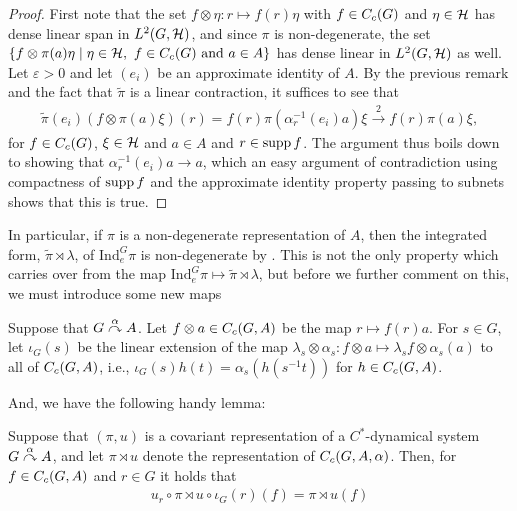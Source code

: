 \begin{proof}
	First note that the set $ f \otimes \eta \colon r \mapsto f(r) \eta$ with $f \in C_c(G)$ and $\eta \in \mathcal{H}$ has dense linear span in $L^2(G,\mathcal{H})$, and since $\pi$ is non-degenerate, the set $\{ f \otimes \pi(a) \eta \mid \eta \in \mathcal{H}, \ f \in C_c(G) \text{ and } a \in A \}$ has dense linear in $L^2(G, \mathcal{H})$ as well. Let $\varepsilon > 0$ and let $(e_i)$ be an approximate identity of $A$. By the previous remark and the fact that $\tilde{\pi}$ is a linear contraction, it suffices to see that 
	\begin{align*}
		\tilde{\pi}(e_i) (f \otimes \pi(a) \xi)(r)=f(r) \pi(\alpha_{r}^{-1}(e_i)a) \xi   \stackrel 2 \to f(r) \pi(a) \xi,
	\end{align*}
	for $f \in C_c(G)$, $\xi \in \mathcal{H}$ and $a \in A$ and $r \in \operatorname{supp} f$. The argument thus boils down to showing that $\alpha_r^{-1}(e_i) a \to a$, which an easy argument of contradiction using compactness of $\operatorname{supp} f$ and the approximate identity property passing to subnets shows that this is true.
\end{proof}
\begin{remark}
	In particular, if $\pi$ is a non-degenerate representation of $A$, then the integrated form, $\tilde{\pi} \rtimes \lambda$, of $\mathrm{Ind}_e^G \pi$ is non-degenerate by . This is not the only property which carries over from the map $\mathrm{Ind}_e^G \pi \mapsto \tilde{\pi} \rtimes \lambda$, but before we further comment on this, we must introduce some new maps
\end{remark}
\begin{definition}
	Suppose that $G \stackrel{\alpha}{\curvearrowright} A$. Let $f \otimes a  \in C_c(G,A)$ be the map $r \mapsto f(r)a$. For $s \in G$, let $\iota_G(s)$ be the linear extension of the map $\lambda_s \otimes \alpha_s \colon f \otimes a \mapsto \lambda_s f \otimes \alpha_s(a)$ to all of $C_c(G,A)$, i.e., $\iota_G(s) h(t) = \alpha_s(h(s^{-1}t))$ for $h \in C_c(G,A)$.
\end{definition}
And, we have the following handy lemma:
\begin{lemma}
	Suppose that $(\pi,u)$ is a covariant representation of a $C^*$-dynamical system $G \stackrel{\alpha}{\curvearrowright} A$, and let $\pi \rtimes u$ denote the representation of $C_c(G,A,\alpha)$. Then, for $f \in C_c(G,A)$ and $r \in G$ it holds that
	\begin{align*}
		 u_r  \circ \pi \rtimes u \circ \iota_G(r) (f) =   \pi \rtimes u (f)
	\end{align*}
	\label{cross:iotaG}
\end{lemma}
